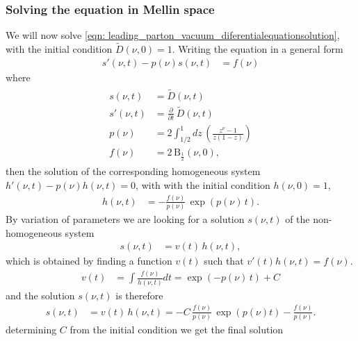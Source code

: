 \documentclass[main.tex]{subfiles}
\begin{document}
\subsubsection*{Solving the equation in Mellin space}
We will now solve \autoref{eqn: leading_parton_vacuum_diferentialequationsolution}, with the initial condition \(\tilde{D}(\nu, 0) =1\). Writing the equation in a general form
\begin{align}\label{eqn: leading_simplediff}
    s'(\nu,t) - p(\nu) s(\nu,t) &= f(\nu)
\end{align}
where
\begin{align}\label{eqn: leading_fullfunctions_definitions}
    \begin{split}
    s(\nu,t) &= \tilde{D}(\nu,t) \\
    s'(\nu,t) &= \frac{\partial}{\partial t}\, \tilde{D}(\nu,t) \\
    p(\nu) &= 2\int_{1/2}^{1} dz \, \left( \frac{z^\nu-1}{z(1-z)}\right) \\
    f(\nu) &= 2 \, \mathrm{B}_{\frac{1}{2}}(\nu,0),
    \end{split}
\end{align}
then the solution of the corresponding homogeneous system \(h'(\nu,t) - p(\nu) h(\nu,t) = 0\), with with the initial condition \(h(\nu,0) = 1\),
\begin{align}
    h(\nu,t) &= - \frac{f(\nu)}{p(\nu)} \, \exp\left(p(\nu) \,t\right). 
\end{align}
By variation of parameters we are looking for a solution \(s(\nu,t)\) of the non-homogeneous system
\begin{align}
    s(\nu, t) &= v(t) \, h(\nu, t),
\end{align}
which is obtained by finding a function \(v(t)\) such that \(v'(t)h(\nu,t) = f(\nu)\).
\begin{align}
    v(t) &= \int \frac{f(\nu)}{h(\nu, t)} dt
    = \exp\left(-p(\nu) \,t\right) + C
\end{align}
and the solution \(s(\nu,t)\) is therefore
\begin{align}
    s(\nu,t) &= v(t) \, h(\nu, t)
    = -C\,\frac{f(\nu)}{p(\nu)}\, \exp(p(\nu)t) - \frac{f(\nu)}{p(\nu)}.
\end{align}
determining \(C\) from the initial condition we get the final solution 
\end{document}
